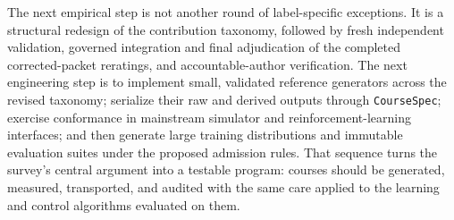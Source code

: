 The next empirical step is not another round of label-specific exceptions. It is a
structural redesign of the contribution taxonomy, followed by fresh independent
validation, governed integration and final adjudication of the completed
corrected-packet reratings, and accountable-author verification. The next engineering
step is to implement small, validated
reference generators across the revised taxonomy; serialize their raw and derived
outputs through \texttt{CourseSpec}; exercise conformance in mainstream simulator and
reinforcement-learning interfaces; and then generate large training distributions and
immutable evaluation suites under the proposed admission rules. That sequence turns
the survey's central argument into a testable program: courses should be generated,
measured, transported, and audited with the same care applied to the learning and
control algorithms evaluated on them.

